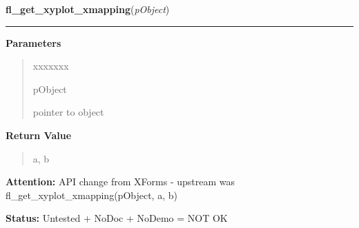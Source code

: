 \hspace{.8\funcindent}\begin{boxedminipage}{\funcwidth}

    \raggedright \textbf{fl\_get\_xyplot\_xmapping}(\textit{pObject})

    \vspace{-1.5ex}

    \rule{\textwidth}{0.5\fboxrule}
\setlength{\parskip}{2ex}
\setlength{\parskip}{1ex}
      \textbf{Parameters}
      \vspace{-1ex}

      \begin{quote}
        \begin{Ventry}{xxxxxxx}

          \item[pObject]

          pointer to object

        \end{Ventry}

      \end{quote}

      \textbf{Return Value}
    \vspace{-1ex}

      \begin{quote}
      a, b

      \end{quote}

\textbf{Attention:} API change from XForms - upstream was fl\_get\_xyplot\_xmapping(pObject, a,
b)



\textbf{Status:} Untested + NoDoc + NoDemo = NOT OK



    \end{boxedminipage}

    \label{xformslib:library:fl_get_xyplot_ymapping}

    \vspace{0.5ex}

